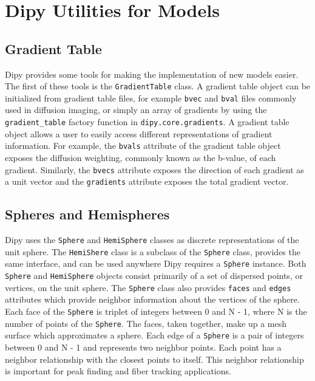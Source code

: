 \section{Dipy Utilities for Models}

\subsection{Gradient Table}
Dipy provides some tools for making the implementation of new models easier. The first of these tools is the \verb|GradientTable| class. A gradient table object can be initialized from gradient table files, for example \verb|bvec| and \verb|bval| files commonly used in diffusion imaging, or simply an array of gradients by using the \verb|gradient_table| factory function in \verb|dipy.core.gradients|. A gradient table object allows a user to easily access different representations of gradient information. For example, the \verb|bvals| attribute of the gradient table object exposes the diffusion weighting, commonly known as the b-value, of each gradient. Similarly, the \verb|bvecs| attribute exposes the direction of each gradient as a unit vector and the \verb|gradients| attribute exposes the total gradient vector.

\subsection{Spheres and Hemispheres}
Dipy uses the \verb|Sphere| and \verb|HemiSphere| classes as discrete representations of the unit sphere. The \verb|HemiShere| class is a subclass of the \verb|Sphere| class, provides the same interface, and can be used anywhere Dipy requires a \verb|Sphere| instance.  Both \verb|Sphere| and \verb|HemiSphere| objects consist primarily of a set of dispersed points, or vertices, on the unit sphere. The \verb|Sphere| class also provides \verb|faces| and \verb|edges| attributes which provide neighbor information about the vertices of the sphere. Each face of the \verb|Sphere| is triplet of integers between 0 and N - 1, where N is the number of points of the \verb|Sphere|. The faces, taken together, make up a mesh surface which approximates a sphere. Each edge of a \verb|Sphere| is a pair of integers between 0 and N - 1 and represents two neighbor points. Each point has a neighbor relationship with the closest points to itself. This neighbor relationship is important for peak finding and fiber tracking applications.

